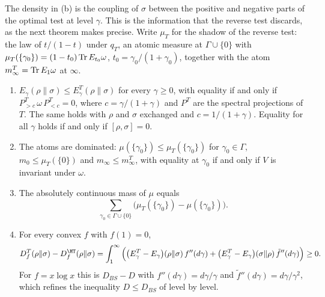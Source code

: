 The density in (b) is the coupling of $\sigma$ between the positive and negative parts of the optimal test at level $\gamma$. This is the information that the reverse test discards, as the next theorem makes precise. Write $\mu_T$ for the shadow of the reverse test: the law of $t/(1-t)$ under $q_T$, an atomic measure at $\Gamma\cup\{0\}$ with $\mu_T(\{\gamma_0\})=(1-t_0)\operatorname{Tr} E_{t_0}\omega$, $t_0=\gamma_0/(1+\gamma_0)$, together with the atom $m^T_\infty=\operatorname{Tr} E_1\omega$ at $\infty$.

\begin{theorem}\label{shA:thm:Tlift}
\begin{enumerate}[label=(\alph*)]
\item $E_\gamma(\rho\|\sigma)\le E^T_\gamma(\rho\|\sigma)$ for every $\gamma\ge0$, with equality if and only if $P^T_{>c}\,\omega\,P^T_{<c}=0$, where $c=\gamma/(1+\gamma)$ and $P^T$ are the spectral projections of $T$. The same holds with $\rho$ and $\sigma$ exchanged and $c=1/(1+\gamma)$. Equality for all $\gamma$ holds if and only if $[\rho,\sigma]=0$.
\item The atoms are dominated: $\mu(\{\gamma_0\})\le\mu_T(\{\gamma_0\})$ for $\gamma_0\in\Gamma$, $m_0\le\mu_T(\{0\})$ and $m_\infty\le m^T_\infty$, with equality at $\gamma_0$ if and only if $V$ is invariant under $\omega$.
\item The absolutely continuous mass of $\mu$ equals
\[
\sum_{\gamma_0\in\Gamma\cup\{0\}}\big(\mu_T(\{\gamma_0\})-\mu(\{\gamma_0\})\big).
\]
\item For every convex $f$ with $f(1)=0$,
\[
D^T_f(\rho\|\sigma)-D^\HT_f(\rho\|\sigma)=\int_1^\infty\Big(\big(E^T_\gamma-E_\gamma\big)(\rho\|\sigma)\,f''(d\gamma)+\big(E^T_\gamma-E_\gamma\big)(\sigma\|\rho)\,\tilde f''(d\gamma)\Big)\ge0 .
\]
For $f=x\log x$ this is $D_{BS}-D$ with $f''(d\gamma)=d\gamma/\gamma$ and $\tilde f''(d\gamma)=d\gamma/\gamma^2$, which refines the inequality $D\le D_{BS}$ of \cite{HiaiPetz1991} level by level.
\end{enumerate}
\end{theorem}

